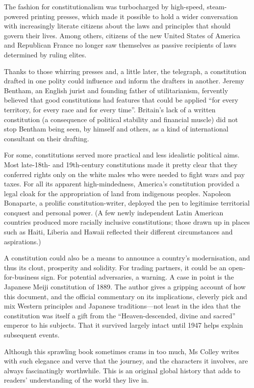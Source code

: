 \documentclass{article}
\begin{document}
The fashion for constitutionalism was turbocharged by high-speed, steam-powered printing presses, which made it possible to hold a wider conversation with increasingly literate citizens about the laws and principles that should govern their lives. Among others, citizens of the new United States of America and Republican France no longer saw themselves as passive recipients of laws determined by ruling elites. 

Thanks to those whirring presses and, a little later, the telegraph, a constitution drafted in one polity could influence and inform the drafters in another. Jeremy Bentham, an English jurist and founding father of utilitarianism, fervently believed that good constitutions had features that could be applied ``for every territory, for every race and for every time''. Britain's lack of a written constitution (a consequence of political stability and financial muscle) did not stop Bentham being seen, by himself and others, as a kind of international consultant on their drafting. 

For some, constitutions served more practical and less idealistic political aims. Most late-18th- and 19th-century constitutions made it pretty clear that they conferred rights only on the white males who were needed to fight wars and pay taxes. For all its apparent high-mindedness, America's constitution provided a legal cloak for the appropriation of land from indigenous peoples. Napoleon Bonaparte, a prolific constitution-writer, deployed the pen to legitimise territorial conquest and personal power. (A few newly independent Latin American countries produced more racially inclusive constitutions; those drawn up in places such as Haiti, Liberia and Hawaii reflected their different circumstances and aspirations.) 

A constitution could also be a means to announce a country's modernisation, and thus its clout, prosperity and solidity. For trading partners, it could be an open-for-business sign. For potential adversaries, a warning. A case in point is the Japanese Meiji constitution of 1889. The author gives a gripping account of how this document, and the official commentary on its implications, cleverly pick and mix Western principles and Japanese traditions---not least in the idea that the constitution was itself a gift from the ``Heaven-descended, divine and sacred'' emperor to his subjects. That it survived largely intact until 1947 helps explain subsequent events. 

Although this sprawling book sometimes crams in too much, Ms Colley writes with such elegance and verve that the journey, and the characters it involves, are always fascinatingly worthwhile. This is an original global history that adds to readers' understanding of the world they live in. {} 
\clearpage
\end{document}
